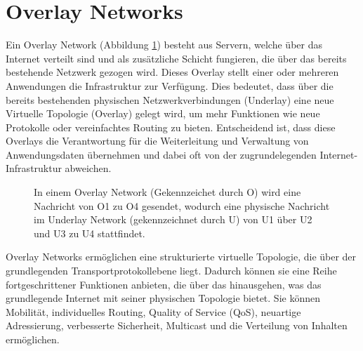 \section{Overlay Networks}
\label{chap:overlay_networks}

Ein Overlay Network (Abbildung \ref{imgs:overlay_network}) besteht aus Servern, welche über das Internet verteilt sind und als zusätzliche Schicht fungieren, die über das bereits bestehende Netzwerk gezogen wird. Dieses Overlay stellt einer oder mehreren Anwendungen die Infrastruktur zur Verfügung. Dies bedeutet, dass über die bereits bestehenden physischen Netzwerkverbindungen (Underlay) eine neue Virtuelle Topologie (Overlay) gelegt wird, um mehr Funktionen wie neue Protokolle oder vereinfachtes Routing zu bieten. Entscheidend ist, dass diese Overlays die Verantwortung für die Weiterleitung und Verwaltung von Anwendungsdaten übernehmen und dabei oft von der zugrundelegenden Internet-Infrastruktur abweichen\cite{OverlayNetwork}.

\begin{figure}[h!]
    \centering
    
    \caption{In einem Overlay Network (Gekennzeichet durch O) wird eine Nachricht von O1 zu O4 gesendet, wodurch eine physische Nachricht im Underlay Network (gekennzeichnet durch U) von U1 über U2 und U3 zu U4 stattfindet.}
    \label{imgs:overlay_network}
\end{figure}

Overlay Networks ermöglichen eine strukturierte virtuelle Topologie, die über der grundlegenden Transportprotokollebene liegt. Dadurch können sie eine Reihe fortgeschrittener Funktionen anbieten, die über das hinausgehen, was das grundlegende Internet mit seiner physischen Topologie bietet. Sie können Mobilität, individuelles Routing, Quality of Service (QoS), neuartige Adressierung, verbesserte Sicherheit, Multicast und die Verteilung von Inhalten ermöglichen\cite{FutureOfTheInternet}.
